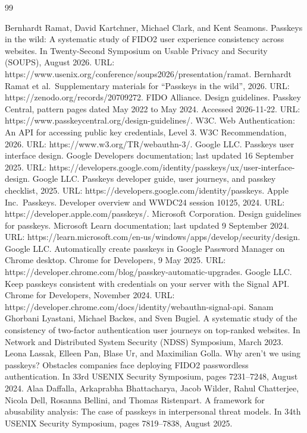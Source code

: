 \documentclass[letterpaper,twocolumn,10pt]{article}
\begin{document}
\begin{thebibliography}{99}\small\raggedright
{} Bernhardt Ramat, David Kartchner, Michael Clark, and Kent Seamons. Passkeys in the wild: A systematic study of FIDO2 user experience consistency across websites. In Twenty-Second Symposium on Usable Privacy and Security (SOUPS), August 2026. URL: https://www.usenix.org/conference/soups2026/presentation/ramat.
 Bernhardt Ramat et al.~Supplementary materials for ``Passkeys in the wild'', 2026. URL: https://zenodo.org/records/20709272.
 FIDO Alliance. Design guidelines. Passkey Central, pattern pages dated May 2022 to May 2024. Accessed 2026-11-22. URL: https://www.passkeycentral.org/design-guidelines/.
 W3C. Web Authentication: An API for accessing public key credentials, Level 3. W3C Recommendation, 2026. URL: https://www.w3.org/TR/webauthn-3/.
 Google LLC. Passkeys user interface design. Google Developers documentation; last updated 16 September 2025. URL: https://developers.google.com/identity/passkeys/ux/user-interface-design.
 Google LLC. Passkeys developer guide, user journeys, and passkey checklist, 2025. URL: https://developers.google.com/identity/passkeys.
 Apple Inc.~Passkeys. Developer overview and WWDC24 session 10125, 2024. URL: https://developer.apple.com/passkeys/.
 Microsoft Corporation. Design guidelines for passkeys. Microsoft Learn documentation; last updated 9 September 2024. URL: https://learn.microsoft.com/en-us/windows/apps/develop/security/design.
 Google LLC. Automatically create passkeys in Google Password Manager on Chrome desktop. Chrome for Developers, 9 May 2025. URL: https://developer.chrome.com/blog/passkey-automatic-upgrades.
 Google LLC. Keep passkeys consistent with credentials on your server with the Signal API. Chrome for Developers, November 2024. URL: https://developer.chrome.com/docs/identity/webauthn-signal-api.
 Sanam Ghorbani Lyastani, Michael Backes, and Sven Bugiel. A systematic study of the consistency of two-factor authentication user journeys on top-ranked websites. In Network and Distributed System Security (NDSS) Symposium, March 2023.
 Leona Lassak, Elleen Pan, Blase Ur, and Maximilian Golla. Why aren't we using passkeys? Obstacles companies face deploying FIDO2 passwordless authentication. In 33rd USENIX Security Symposium, pages 7231--7248, August 2024.
 Alaa Daffalla, Arkaprabha Bhattacharya, Jacob Wilder, Rahul Chatterjee, Nicola Dell, Rosanna Bellini, and Thomas Ristenpart. A framework for abusability analysis: The case of passkeys in interpersonal threat models. In 34th USENIX Security Symposium, pages 7819--7838, August 2025.

\end{thebibliography}
\end{document}

